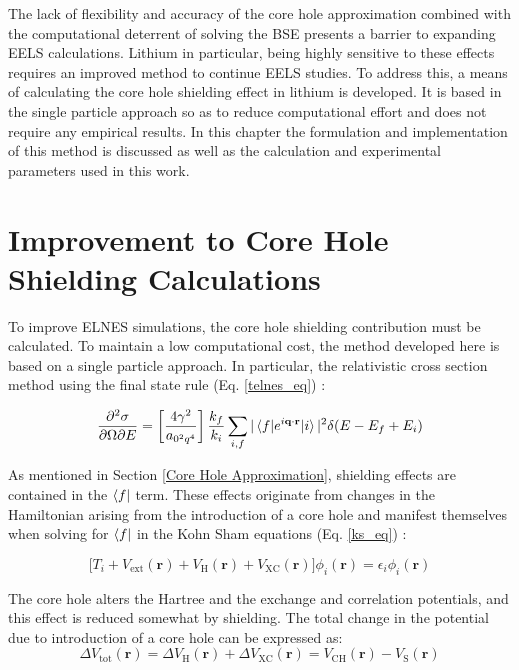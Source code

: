 




The lack of flexibility and accuracy of the core hole approximation combined with the computational deterrent of solving the BSE presents a barrier to expanding EELS calculations.  Lithium in particular, being highly sensitive to these effects requires an improved method to continue EELS studies.  To address this, a means of calculating the core hole shielding effect in lithium is developed.  It is based in the single particle approach so as to reduce computational effort and does not require any empirical results.  In this chapter the formulation and implementation of this method is discussed as well as the calculation and experimental parameters used in this work. 


\section{Improvement to Core Hole Shielding Calculations}
To improve ELNES simulations, the core hole shielding contribution must be calculated.   To maintain a low computational cost, the method developed here is based on a single particle approach.  In particular, the relativistic cross section method using the final state rule (Eq. \ref{telnes_eq}) \cite{jorissen2007ab}:

\begin{equation}
	\frac{\partial^2 \sigma}{\partial \Omega \partial E} = \left[\frac{4\gamma^2}{a_{\mathrm{0}^2q^4}}\right] \frac{k_f}{k_i} \sum_{i,f}|\mel{f}{e^{i\textbf{q}\cdot\textbf{r}}}{i}|^2\delta(E-E_f+E_i)
\end{equation}

As mentioned in Section \ref{Core Hole Approximation}, shielding effects are contained in the $\bra{f}$ term. These effects originate from changes in the Hamiltonian arising from the introduction of a core hole and manifest themselves when solving for $\bra{f}$ in the Kohn Sham equations (Eq. \ref{ks_eq}) \cite{kohn_self-consistent_1965}:  

\begin{equation}
    \bigg[T_i + V_{\mathrm{ext}}(\textbf{r}) + V_{\mathrm{H}}(\textbf{r}) + V_{\mathrm{XC}}(\textbf{r})\bigg] \phi_i(\textbf{r}) = \epsilon_i \phi_i(\textbf{r})
\end{equation}

The core hole alters the Hartree and the exchange and correlation potentials, and this effect is reduced somewhat by shielding.  The total change in the potential due to introduction of a core hole can be expressed as: 
\begin{equation}
\Delta V_{\mathrm{tot}}(\textbf{r})=\Delta V_{\mathrm{H}}(\textbf{r}) +\Delta V_{\mathrm{XC}}(\textbf{r})=V_{\mathrm{CH}}(\textbf{r}) - V_{\mathrm{S}}(\textbf{r})
\label{delta_potentials}
\end{equation}

